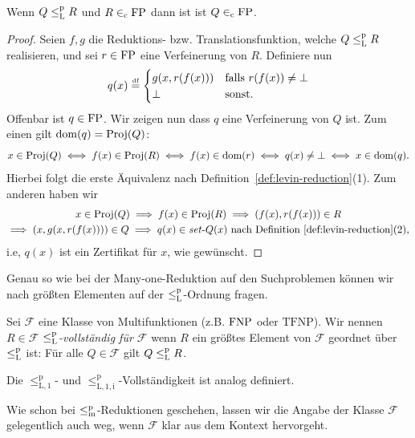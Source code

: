 \begin{lemma}
    Wenn $Q\leq_\mathrm{L}^\mathrm{p} R$ und $R\in_\mathrm{c}\mathrm{FP}$ dann ist ist $Q\in_\mathrm{c} \mathrm{FP}$.
\end{lemma}
\begin{proof}
    Seien $f,g$ die Reduktions- bzw. Translationsfunktion, welche $Q\leq_\mathrm{L}^\mathrm{p} R$ realisieren, und sei $r\in\mathrm{FP}$ eine Verfeinerung von $R$.
    Definiere nun
    \[ q(x) \stackrel{\text{\smash{\tiny df}}}{=} \begin{cases} g(x, r(f(x))) & \text{falls $r(f(x))\neq \bot$} \\ \bot & \text{sonst}.\end{cases} \]
    Offenbar ist $q\in\mathrm{FP}$. Wir zeigen nun dass $q$ eine Verfeinerung von $Q$ ist.
    Zum einen gilt $\operatorname{dom}(q)=\operatorname{Proj}(Q)$:
    \[ x\in\operatorname{Proj}(Q) \iff f(x)\in\operatorname{Proj}(R) \iff f(x)\in\operatorname{dom}(r) \iff q(x)\neq\bot \iff x\in\operatorname{dom}(q). \]
    Hierbei folgt die erste Äquivalenz nach Definition~\ref{def:levin-reduction}(1).
    Zum anderen haben wir
    \begin{gather*}
        x\in\operatorname{Proj}(Q) \implies f(x)\in\operatorname{Proj}(R) \implies (f(x), r(f(x)))\in R\\ \implies (x, g(x, r(f(x))))\in Q \implies q(x)\in\mathit{set}\text{-}{}Q(x) \text{ nach Definition~\ref{def:levin-reduction}(2)},
    \end{gather*}
    i.e, $q(x)$ ist ein Zertifikat für $x$, wie gewünscht.
\end{proof}

Genau so wie bei der Many-one-Reduktion auf den Suchproblemen können wir nach größten Elementen auf der $\leq_\mathrm{L}^\mathrm{p}$-Ordnung fragen.

\begin{definition}
    Sei $\mathcal F$ eine Klasse von Multifunktionen (z.B. $\mathrm{FNP}$ oder $\mathrm{TFNP}$).
    Wir nennen $R\in\mathcal F$ \emph{$\leq_\mathrm{L}^\mathrm{p}$-vollständig für $\mathcal F$} wenn $R$ ein größtes Element von $\mathcal F$ geordnet über $\leq_\mathrm{L}^\mathrm{p}$ ist:
    Für alle $Q\in\mathcal F$ gilt $Q\leq_\mathrm{L}^\mathrm{p} R$.

    Die $\leq_\mathrm{L,1}^\mathrm p$- und $\leq_\mathrm{L,1,i}^\mathrm p$-Vollständigkeit ist analog definiert.
\end{definition}
Wie schon bei $\leq_\mathrm{m}^\mathrm{p}$-Reduktionen geschehen, lassen wir die Angabe der Klasse $\mathcal F$ gelegentlich auch weg, wenn $\mathcal F$ klar aus dem Kontext hervorgeht.

